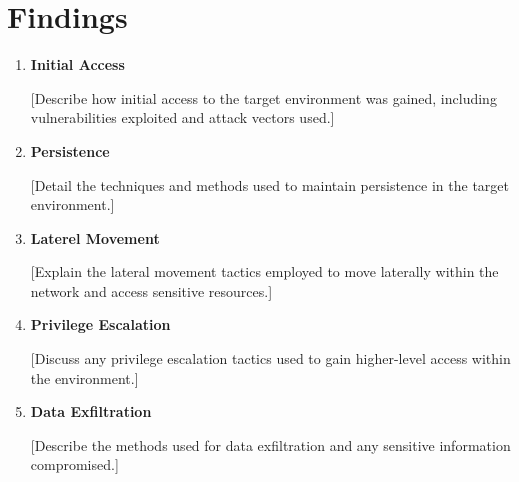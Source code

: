 \section{Findings}
\begin{enumerate}
\item \textbf{Initial Access}

[Describe how initial access to the target environment was gained, including vulnerabilities exploited and attack vectors used.]
\item \textbf{Persistence}

[Detail the techniques and methods used to maintain persistence in the target environment.]
\item \textbf{Laterel Movement}

[Explain the lateral movement tactics employed to move laterally within the network and access sensitive resources.]
\item \textbf{Privilege Escalation}

[Discuss any privilege escalation tactics used to gain higher-level access within the environment.]
\item \textbf{Data Exfiltration}

[Describe the methods used for data exfiltration and any sensitive information compromised.]

\end{enumerate}

